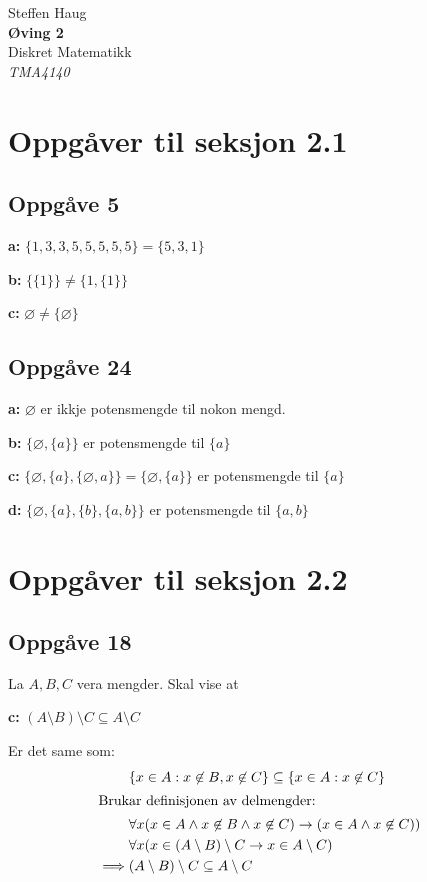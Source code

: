 \documentclass[a4paper, 11pt]{article}
\author{\forfatter}
\date{}
\newcommand{\tittel}{Øving 2}
\newcommand{\fag}{Diskret Matematikk}
\newcommand{\fagkode}{TMA4140}
\newcommand{\forfatter}{Steffen Haug}
\newcommand{\deloppg}[1]{\vspace{1mm}\noindent \textbf{\themecolor{#1:}}}
\newcommand{\themeshade}{Mahogany}
\newcommand{\themecolor}[1]{\textcolor{\themeshade}{#1}}
\newcommand*{\titleTH}{\begingroup %
\raggedleft %
\vspace*{\baselineskip} %

{\Large \forfatter}\\[0.167\textheight] %

{\LARGE\bfseries \tittel}\\[\baselineskip] %

{\themecolor{\Huge \fag}}\\[\baselineskip] %

{\Large \textit{\fagkode}}\par %

\vfill %
\endgroup}
\begin{document}
\pagestyle{empty}
\titleTH\newpage

\section{Oppgåver til seksjon 2.1} %
\subsection*{Oppgåve 5}

\deloppg{a} \( \{ 1,3,3,5,5,5,5,5 \} = \{5,3,1\}\)

\deloppg{b} \( \{\{1\}\} \neq \{1, \{1\}\} \)

\deloppg{c} \( \varnothing \neq \{\varnothing\} \)

\subsection*{Oppgåve 24}
\deloppg{a} \( \varnothing \) er ikkje potensmengde til nokon mengd.

\deloppg{b} \( \{\varnothing, \{a\} \} \) er potensmengde til \( \{a\} \)

\deloppg{c} \( \{ \varnothing, \{a\}, \{\varnothing, a\} \} 
= \{\varnothing,\{a\}\} \) er potensmengde til \(\{a\}\)

\deloppg{d} \( \{\varnothing, \{a\}, \{b\}, \{a,b\}\} \) er potensmengde til \(\{a,b\}\)


\section{Oppgåver til seksjon 2.2}

\subsection{Oppgåve 18}
\noindent La \(A,B,C\) vera mengder. Skal vise at

\deloppg{c} \( (A \setminus B) \setminus C \subseteq A \setminus C \)

\noindent Er det same som:
\begin{align*}
    &\{x \in A : x \not\in B, x \not\in C\} \subseteq \{x \in A : x \not\in C\} \\
    \intertext{Brukar definisjonen av delmengder:}
    &\forall x (x \in A \land x\not\in B \land x\not\in C) \rightarrow (x \in A \land x \not\in C))\\
    &\forall x (x \in (A\setminus B)\setminus C \rightarrow x \in A \setminus C) \\
    \implies &(A \setminus B)\setminus C \subseteq A \setminus C
\end{align*}
\end{document}
